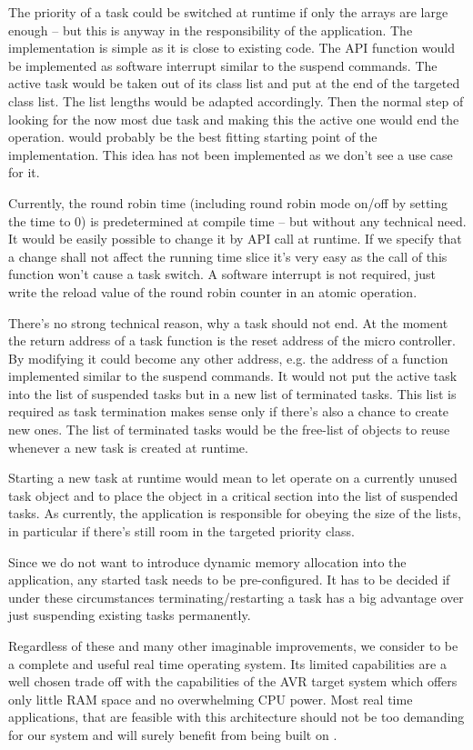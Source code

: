 The priority of a task could be switched at runtime if only the arrays are
large enough -- but this is anyway in the responsibility of the
application. The implementation is simple as it is close to existing code.
The API function would be implemented as software interrupt similar to the
suspend commands. The active task would be taken out of its class list and
put at the end of the targeted class list. The list lengths would be
adapted accordingly. Then the normal step of looking for the now most due
task and making this the active one would end the operation.
 would probably be the best fitting starting point
of the implementation. This idea has not been implemented as we don't see
a use case for it.

Currently, the round robin time (including round robin mode on/off by
setting the time to 0) is predetermined at compile time -- but without any
technical need. It would be easily possible to change it by API call at
runtime. If we specify that a change shall not affect the running time
slice it's very easy as the call of this function won't cause a task
switch. A software interrupt is not required, just write the reload value
of the round robin counter in an atomic operation.

There's no strong technical reason, why a task should not end. At the
moment the return address of a task function is the reset address of the
micro controller. By modifying  it could become
any other address, e.g. the address of a function implemented similar to
the suspend commands. It would not put the active task into the list of
suspended tasks but in a new list of terminated tasks. This list is
required as task termination makes sense only if there's also a chance to
create new ones. The list of terminated tasks would be the free-list of
objects to reuse whenever a new task is created at runtime.

Starting a new task at runtime would mean to let 
operate on a currently unused task object and to place the object in a
critical section into the list of suspended tasks. As currently, the
application is responsible for obeying the size of the lists, in
particular if there's still room in the targeted priority class.

Since we do not want to introduce dynamic memory allocation into the
application, any started task needs to be pre-configured. It has to be
decided if under these circumstances terminating/restarting a task has a
big advantage over just suspending existing tasks permanently.

Regardless of these and many other imaginable improvements, we consider
\rtos{} to be a complete and useful real time operating system. Its
limited capabilities are a well chosen trade off with the capabilities of
the AVR target system which offers only little RAM space and no
overwhelming CPU power. Most real time applications, that are feasible
with this architecture should not be too demanding for our system and will
surely benefit from being built on \rtos. 